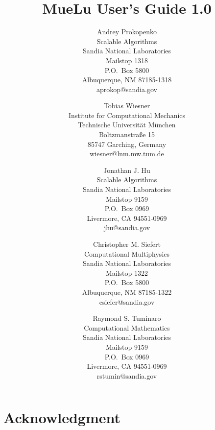\documentclass[pdf,12pt,report]{SANDreport}
\title{MueLu User's Guide 1.0}
\author{Andrey Prokopenko \\
  Scalable Algorithms \\
  Sandia National Laboratories\\
  Mailstop 1318 \\
  P.O.~Box 5800 \\
  Albuquerque, NM 87185-1318\\
  aprokop@sandia.gov\\
  \and
  Tobias Wiesner \\
  Institute for Computational Mechanics \\
  Technische Universit\"at M\"unchen\\
  Boltzmanstra\ss e 15 \\
  85747 Garching, Germany\\
  wiesner@lnm.mw.tum.de\\
  \and
  Jonathan J. Hu \\
  Scalable Algorithms \\
  Sandia National Laboratories\\
  Mailstop 9159 \\
  P.O.~Box 0969 \\
  Livermore, CA 94551-0969\\
  jhu@sandia.gov
  \and
  Christopher M. Siefert\\
  Computational Multiphysics\\
  Sandia National Laboratories\\
  Mailstop 1322 \\
  P.O.~Box 5800 \\
  Albuquerque, NM 87185-1322\\
  csiefer@sandia.gov
  \and
  Raymond S. Tuminaro\\
  Computational Mathematics\\
  Sandia National Laboratories\\
  Mailstop 9159 \\
  P.O.~Box 0969 \\
  Livermore, CA 94551-0969\\
  rstumin@sandia.gov
}
\date{}
\begin{document}
    \maketitle

    \begin{abstract}
	
    \end{abstract}


    \clearpage
    \chapter*{Acknowledgment}
	


    \cleardoublepage		%
    \tableofcontents
    \listoffigures
    \listoftables




\end{document}
